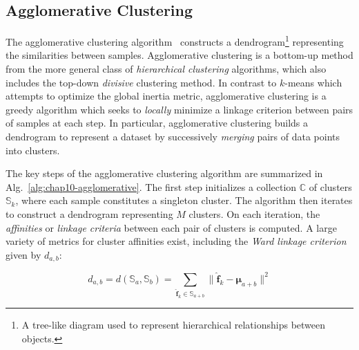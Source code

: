 
\subsection{Agglomerative Clustering}
\label{subsec:chap10-agglomerative}

The agglomerative clustering algorithm~\cite{johnson1967hierarchical} constructs a dendrogram\footnote{A tree-like diagram used to represent hierarchical relationships between objects.} representing the similarities between samples. Agglomerative clustering is a bottom-up method from the more general class of \textit{hierarchical clustering} algorithms, which also includes the top-down \textit{divisive} clustering method. In contrast to $k$-means which attempts to optimize the global inertia metric, agglomerative clustering is a greedy algorithm which seeks to \textit{locally} minimize a linkage criterion between pairs of samples at each step. In particular, agglomerative clustering builds a dendrogram to represent a dataset  by successively \textit{merging} pairs of data points into clusters.

The key steps of the agglomerative clustering algorithm are summarized in Alg.~\ref{alg:chap10-agglomerative}. The first step initializes a collection $\mathbb{C}$ of clusters $\mathbb{S}_{k}$, where each sample constitutes a singleton cluster. The algorithm then iterates to construct a dendrogram representing $M$ clusters. On each iteration, the \textit{affinities} or \textit{linkage criteria} between each pair of clusters is computed. A large variety of metrics for cluster affinities exist, including the \textit{Ward linkage criterion}~\cite{ward1963hierarchical} given by $d_{a,b}$:

\begin{equation}
\label{eqn:chap10-agglomerative-ward}
d_{a,b} = d\left(\mathbb{S}_{a}, \mathbb{S}_{b}\right) = \displaystyle\sum\limits_{\boldsymbol{\hat{f}}_{k} \in \mathbb{S}_{a+b}} \|\boldsymbol{\hat{f}}_{k} - \boldsymbol{\mu}_{a+b}\|^{2}
\end{equation}

